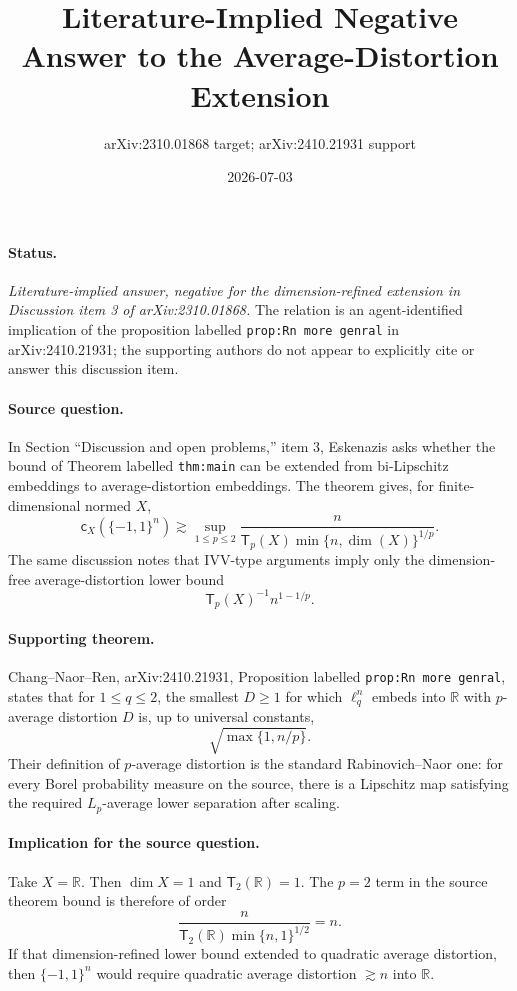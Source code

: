 \documentclass[11pt]{article}
\title{Literature-Implied Negative Answer to the Average-Distortion Extension}
\author{arXiv:2310.01868 target; arXiv:2410.21931 support}
\date{2026-07-03}
\newcommand{\R}{\mathbb{R}}
\newcommand{\T}{\mathsf{T}}
\newcommand{\cH}{\{-1,1\}^n}
\begin{document}
\maketitle

\paragraph{Status.}
\emph{Literature-implied answer, negative for the dimension-refined extension in Discussion item 3 of arXiv:2310.01868.}
The relation is an agent-identified implication of the proposition labelled \texttt{prop:Rn more genral} in arXiv:2410.21931; the supporting authors do not appear to explicitly cite or answer this discussion item.

\paragraph{Source question.}
In Section ``Discussion and open problems,'' item 3, Eskenazis asks whether the bound of Theorem labelled \texttt{thm:main} can be extended from bi-Lipschitz embeddings to average-distortion embeddings.  The theorem gives, for finite-dimensional normed \(X\),
\[
  \mathsf{c}_X(\{-1,1\}^n)
  \gtrsim
  \sup_{1\le p\le 2}
  \frac{n}{\T_p(X)\min\{n,\dim(X)\}^{1/p}}.
\]
The same discussion notes that IVV-type arguments imply only the dimension-free average-distortion lower bound
\[
  \T_p(X)^{-1}n^{1-1/p}.
\]

\paragraph{Supporting theorem.}
Chang--Naor--Ren, arXiv:2410.21931, Proposition labelled \texttt{prop:Rn more genral}, states that for \(1\le q\le 2\), the smallest \(D\ge 1\) for which \(\ell_q^n\) embeds into \(\R\) with \(p\)-average distortion \(D\) is, up to universal constants,
\[
  \sqrt{\max\{1,n/p\}}.
\]
Their definition of \(p\)-average distortion is the standard Rabinovich--Naor one: for every Borel probability measure on the source, there is a Lipschitz map satisfying the required \(L_p\)-average lower separation after scaling.

\paragraph{Implication for the source question.}
Take \(X=\R\).  Then \(\dim X=1\) and \(\T_2(\R)=1\).  The \(p=2\) term in the source theorem bound is therefore of order
\[
  \frac{n}{\T_2(\R)\min\{n,1\}^{1/2}} = n.
\]
If that dimension-refined lower bound extended to quadratic average distortion, then \(\cH\) would require quadratic average distortion \(\gtrsim n\) into \(\R\).
\end{document}
